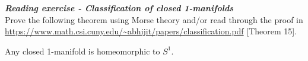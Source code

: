 \hspace{1cm}

\begin{exercise} \textbf{\textit{Reading exercise - Classification of closed 1-manifolds}}\\
Prove the following theorem using Morse theory and/or read through the proof in \url{https://www.math.csi.cuny.edu/~abhijit/papers/classification.pdf} [Theorem 15]. 
	\begin{thm}
			Any closed 1-manifold is homeomorphic to \(S^1\).
        \end{thm}

\end{exercise}







